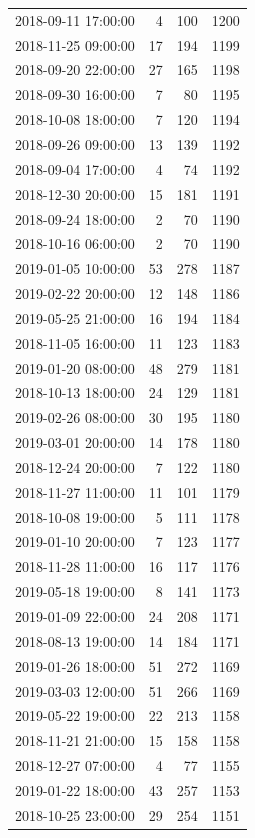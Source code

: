 \begin{tabular}{lrrr}
2018-09-11 17:00:00 & 4 & 100 & 1200 \\
2018-11-25 09:00:00 & 17 & 194 & 1199 \\
2018-09-20 22:00:00 & 27 & 165 & 1198 \\
2018-09-30 16:00:00 & 7 & 80 & 1195 \\
2018-10-08 18:00:00 & 7 & 120 & 1194 \\
2018-09-26 09:00:00 & 13 & 139 & 1192 \\
2018-09-04 17:00:00 & 4 & 74 & 1192 \\
2018-12-30 20:00:00 & 15 & 181 & 1191 \\
2018-09-24 18:00:00 & 2 & 70 & 1190 \\
2018-10-16 06:00:00 & 2 & 70 & 1190 \\
2019-01-05 10:00:00 & 53 & 278 & 1187 \\
2019-02-22 20:00:00 & 12 & 148 & 1186 \\
2019-05-25 21:00:00 & 16 & 194 & 1184 \\
2018-11-05 16:00:00 & 11 & 123 & 1183 \\
2019-01-20 08:00:00 & 48 & 279 & 1181 \\
2018-10-13 18:00:00 & 24 & 129 & 1181 \\
2019-02-26 08:00:00 & 30 & 195 & 1180 \\
2019-03-01 20:00:00 & 14 & 178 & 1180 \\
2018-12-24 20:00:00 & 7 & 122 & 1180 \\
2018-11-27 11:00:00 & 11 & 101 & 1179 \\
2018-10-08 19:00:00 & 5 & 111 & 1178 \\
2019-01-10 20:00:00 & 7 & 123 & 1177 \\
2018-11-28 11:00:00 & 16 & 117 & 1176 \\
2019-05-18 19:00:00 & 8 & 141 & 1173 \\
2019-01-09 22:00:00 & 24 & 208 & 1171 \\
2018-08-13 19:00:00 & 14 & 184 & 1171 \\
2019-01-26 18:00:00 & 51 & 272 & 1169 \\
2019-03-03 12:00:00 & 51 & 266 & 1169 \\
2019-05-22 19:00:00 & 22 & 213 & 1158 \\
2018-11-21 21:00:00 & 15 & 158 & 1158 \\
2018-12-27 07:00:00 & 4 & 77 & 1155 \\
2019-01-22 18:00:00 & 43 & 257 & 1153 \\
2018-10-25 23:00:00 & 29 & 254 & 1151 \\

\end{tabular}
